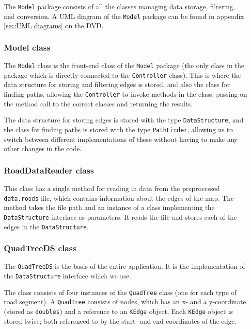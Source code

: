 The \texttt{Model} package consists of all the classes managing data storage, filtering, and conversion. A UML diagram of the \texttt{Model} package can be found in appendix \ref{sec:UML diagrams} on the DVD.

\subsubsection{Model class} %
The \texttt{Model} class is the front-end class of the \texttt{Model} package (the only class in the package which is directly connected to the \texttt{Controller} class). This is where the data structure for storing and filtering edges is stored, and also the class for finding paths, allowing the \texttt{Controller} to invoke methods in the class, passing on the method call to the correct classes and returning the results.

The data structure for storing edges is stored with the type \texttt{DataStructure}, and the class for finding paths is stored with the type \texttt{PathFinder}, allowing us to switch between different implementations of these without having to make any other changes in the code.

\subsubsection{RoadDataReader class}
This class has a single method for reading in data from the preprocessed \texttt{data.roads} file, which contains information about the edges of the map. The method takes the file path and an instance of a class implementing the \texttt{DataStructure} interface as parameters. It reads the file and stores each of the edges in the \texttt{DataStructure}.

\subsubsection{QuadTreeDS class} %
The \texttt{QuadTreeDS} is the basis of the entire application. It is the implementation of the \texttt{DataStructure} interface which we use.

The class consists of four instances of the \texttt{QuadTree} class (one for each type of road segment). A \texttt{QuadTree} consists of nodes, which has an x- and a y-coordinate (stored as \texttt{doubles}) and a reference to an \texttt{KEdge} object. Each \texttt{KEdge} object is stored twice; both referenced to by the start- and end-coordinates of the edge.

